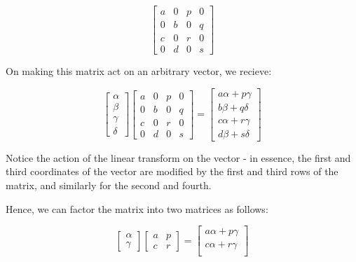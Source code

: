 \documentclass[11pt]{article}
\begin{document}
\[
    \left [
        \begin{array}{cc|cc}
            a & 0 & p & 0\\
            0 & b & 0 & q \\
            \hline
            c & 0 & r & 0 \\
            0 & d & 0 & s
        \end{array}
    \right ]
\]

On making this matrix act on an arbitrary vector, we recieve:


\[
    \begin{bmatrix} \alpha \\ \beta \\ \gamma \\ \delta \end{bmatrix}
    \left [
        \begin{array}{cc|cc}
            a & 0 & p & 0\\
            0 & b & 0 & q \\
            \hline
            c & 0 & r & 0 \\
            0 & d & 0 & s
        \end{array}
    \right ]
    =
    \begin{bmatrix}
        a \alpha + p \gamma \\
        b \beta + q \delta \\
        c \alpha + r \gamma \\
        d \beta + s \delta 
    \end{bmatrix}
\]

Notice the action of the linear transform on the vector - in essence,
the first and third coordinates of the vector are modified by the 
first and third rows of the matrix, and similarly for the second and
fourth.

Hence, we can factor the matrix into two matrices as follows:

\[
    \begin{bmatrix} \alpha \\ \gamma \end{bmatrix}
    \left [
        \begin{array}{cc}
            a & p \\
            c & r
        \end{array}
    \right ]
    =
    \begin{bmatrix}
        a \alpha + p \gamma \\
        c \alpha + r \gamma \\
    \end{bmatrix}
\]
\end{document}
